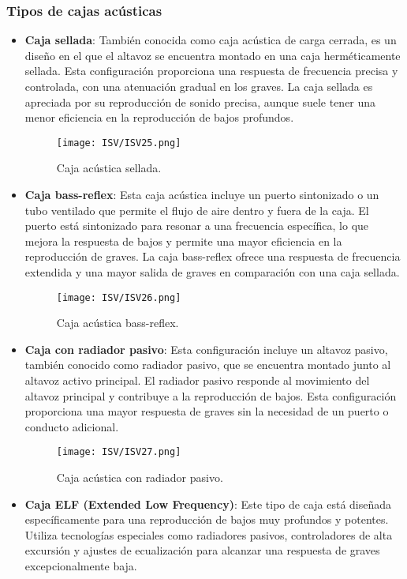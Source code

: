 \documentclass[
	12pt, %
	fleqn, %
	a4paper, %
	oneside, %
]{LegrandOrangeBook}
\begin{document}
\subsubsection{Tipos de cajas acústicas}
\begin{itemize}
\item \textbf{Caja sellada}: También conocida como caja acústica de carga cerrada, es un diseño en el que el altavoz se encuentra montado en una caja herméticamente sellada. Esta configuración proporciona una respuesta de frecuencia precisa y controlada, con una atenuación gradual en los graves. La caja sellada es apreciada por su reproducción de sonido precisa, aunque suele tener una menor eficiencia en la reproducción de bajos profundos.
\begin{figure}[H]
\centering
\texttt{[image: ISV/ISV25.png]}
\caption{Caja acústica sellada.}
\end{figure}
\item \textbf{Caja bass-reflex}: Esta caja acústica incluye un puerto sintonizado o un tubo ventilado que permite el flujo de aire dentro y fuera de la caja. El puerto está sintonizado para resonar a una frecuencia específica, lo que mejora la respuesta de bajos y permite una mayor eficiencia en la reproducción de graves. La caja bass-reflex ofrece una respuesta de frecuencia extendida y una mayor salida de graves en comparación con una caja sellada.
\begin{figure}[H]
\centering
\texttt{[image: ISV/ISV26.png]}
\caption{Caja acústica bass-reflex.}
\end{figure}
\item \textbf{Caja con radiador pasivo}: Esta configuración incluye un altavoz pasivo, también conocido como radiador pasivo, que se encuentra montado junto al altavoz activo principal. El radiador pasivo responde al movimiento del altavoz principal y contribuye a la reproducción de bajos. Esta configuración proporciona una mayor respuesta de graves sin la necesidad de un puerto o conducto adicional.
\begin{figure}[H]
\centering
\texttt{[image: ISV/ISV27.png]}
\caption{Caja acústica con radiador pasivo.}
\end{figure}
\item \textbf{Caja ELF (Extended Low Frequency)}: Este tipo de caja está diseñada específicamente para una reproducción de bajos muy profundos y potentes. Utiliza tecnologías especiales como radiadores pasivos, controladores de alta excursión y ajustes de ecualización para alcanzar una respuesta de graves excepcionalmente baja.

\end{itemize}
\end{document}
